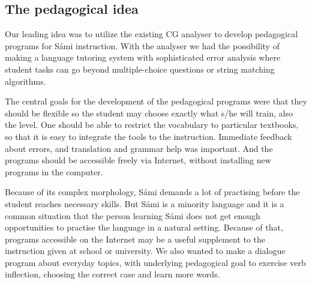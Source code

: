 \documentclass[11pt]{article}
\begin{document}

\subsection{The pedagogical idea} \label{pedidea}

Our leading idea was to utilize the existing CG analyser to develop pedagogical programs for Sámi instruction.  With the analyser we had the possibility of making a language tutoring system with sophisticated error analysis where student tasks can go beyond multiple-choice questions or string matching algorithms. 

The central goals for the development of the pedagogical programs were that they should be flexible so the student may choose exactly what s/he will train, also the level. One should be able to restrict the vocabulary to particular textbooks, so that it is easy to integrate the tools to the instruction. Immediate feedback about errors, and translation and grammar help was important. And the programs should be accessible freely via Internet, without installing new programs in the computer.

Because of its complex morphology, Sámi demands a lot of practising before the student reaches necessary skills. But Sámi is a minority language and it is a common situation that the person learning Sámi does not get enough opportunities to practise the language in a natural setting. Because of that, programs accessible on the Internet may be a useful supplement to the instruction given at school or university. We also wanted to make a dialogue program about everyday topics, with underlying pedagogical goal to exercise verb inflection, choosing the correct case and learn more words. 
\end{document}
